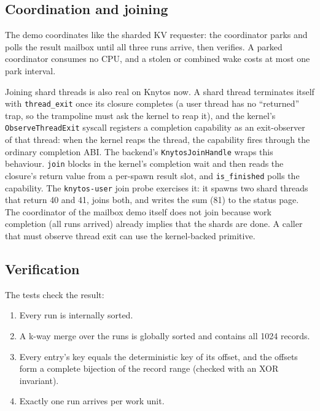 \subsection{Coordination and joining}

The demo coordinates like the sharded KV requester: the coordinator parks and
polls the result mailbox until all three runs arrive, then verifies. A parked
coordinator consumes no CPU, and a stolen or combined wake costs at most one
park interval.

Joining shard threads is also real on Knytos now. A shard thread
terminates itself with \texttt{thread\_exit} once its closure completes (a
user thread has no ``returned'' trap, so the trampoline must ask the kernel
to reap it), and the kernel's \texttt{ObserveThreadExit} syscall registers a
completion capability as an exit-observer of that thread: when the kernel
reaps the thread, the capability fires through the ordinary completion ABI.
The backend's \texttt{KnytosJoinHandle} wraps this behaviour. \texttt{join}
blocks in the kernel's completion wait and then reads the closure's return
value from a per-spawn result slot, and \texttt{is\_finished} polls the
capability. The \texttt{knytos-user} join probe exercises it: it spawns two
shard threads that return 40 and 41, joins both, and writes the sum (81) to
the status page. The coordinator of the mailbox demo itself does not join because
work completion (all runs arrived) already implies that the shards are done. A
caller that must observe thread exit can use the kernel-backed primitive.

\subsection{Verification}

The tests check the result:

\begin{enumerate}
    \item Every run is internally sorted.
    \item A k-way merge over the runs is globally sorted and contains all
        1024 records.
    \item Every entry's key equals the deterministic key of its offset,
        and the offsets form a complete bijection of the record range
        (checked with an XOR invariant).
    \item Exactly one run arrives per work unit.
\end{enumerate}


